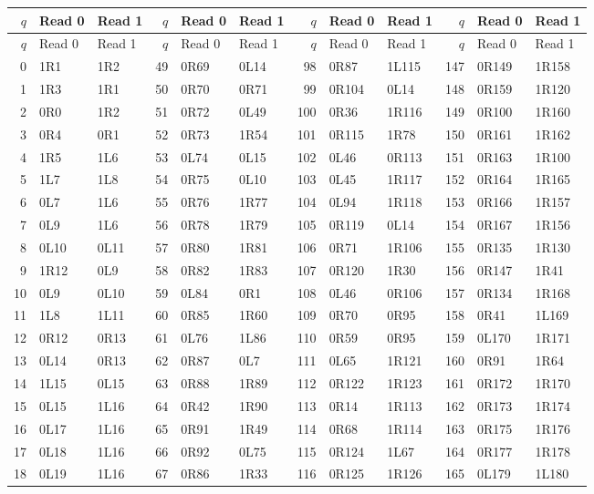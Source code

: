 \begingroup\footnotesize\setlength{\tabcolsep}{5pt}
\begin{longtable}{@{}rllrllrllrll@{}}
\toprule $q$ & Read 0 & Read 1 & $q$ & Read 0 & Read 1 & $q$ & Read 0 & Read 1 & $q$ & Read 0 & Read 1\\\midrule\endfirsthead
\toprule $q$ & Read 0 & Read 1 & $q$ & Read 0 & Read 1 & $q$ & Read 0 & Read 1 & $q$ & Read 0 & Read 1\\\midrule\endhead
0 & 1R1 & 1R2 & 49 & 0R69 & 0L14 & 98 & 0R87 & 1L115 & 147 & 0R149 & 1R158\\
1 & 1R3 & 1R1 & 50 & 0R70 & 0R71 & 99 & 0R104 & 0L14 & 148 & 0R159 & 1R120\\
2 & 0R0 & 1R2 & 51 & 0R72 & 0L49 & 100 & 0R36 & 1R116 & 149 & 0R100 & 1R160\\
3 & 0R4 & 0R1 & 52 & 0R73 & 1R54 & 101 & 0R115 & 1R78 & 150 & 0R161 & 1R162\\
4 & 1R5 & 1L6 & 53 & 0L74 & 0L15 & 102 & 0L46 & 0R113 & 151 & 0R163 & 1R100\\
5 & 1L7 & 1L8 & 54 & 0R75 & 0L10 & 103 & 0L45 & 1R117 & 152 & 0R164 & 1R165\\
6 & 0L7 & 1L6 & 55 & 0R76 & 1R77 & 104 & 0L94 & 1R118 & 153 & 0R166 & 1R157\\
7 & 0L9 & 1L6 & 56 & 0R78 & 1R79 & 105 & 0R119 & 0L14 & 154 & 0R167 & 1R156\\
8 & 0L10 & 0L11 & 57 & 0R80 & 1R81 & 106 & 0R71 & 1R106 & 155 & 0R135 & 1R130\\
9 & 1R12 & 0L9 & 58 & 0R82 & 1R83 & 107 & 0R120 & 1R30 & 156 & 0R147 & 1R41\\
10 & 0L9 & 0L10 & 59 & 0L84 & 0R1 & 108 & 0L46 & 0R106 & 157 & 0R134 & 1R168\\
11 & 1L8 & 1L11 & 60 & 0R85 & 1R60 & 109 & 0R70 & 0R95 & 158 & 0R41 & 1L169\\
12 & 0R12 & 0R13 & 61 & 0L76 & 1L86 & 110 & 0R59 & 0R95 & 159 & 0L170 & 1R171\\
13 & 0L14 & 0R13 & 62 & 0R87 & 0L7 & 111 & 0L65 & 1R121 & 160 & 0R91 & 1R64\\
14 & 1L15 & 0L15 & 63 & 0R88 & 1R89 & 112 & 0R122 & 1R123 & 161 & 0R172 & 1R170\\
15 & 0L15 & 1L16 & 64 & 0R42 & 1R90 & 113 & 0R14 & 1R113 & 162 & 0R173 & 1R174\\
16 & 0L17 & 1L16 & 65 & 0R91 & 1R49 & 114 & 0R68 & 1R114 & 163 & 0R175 & 1R176\\
17 & 0L18 & 1L16 & 66 & 0R92 & 0L75 & 115 & 0R124 & 1L67 & 164 & 0R177 & 1R178\\
18 & 0L19 & 1L16 & 67 & 0R86 & 1R33 & 116 & 0R125 & 1R126 & 165 & 0L179 & 1L180\\

\end{longtable}
